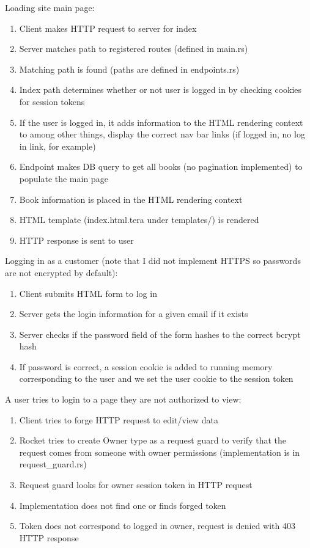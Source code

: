 \documentclass{article}
\begin{document}
Loading site main page:
\begin{enumerate}
  \item Client makes HTTP request to server for index
  \item Server matches path to registered routes (defined in main.rs)
  \item Matching path is found (paths are defined in endpoints.rs)
  \item Index path determines whether or not user is logged in by checking cookies for session tokens
  \item If the user is logged in, it adds information to the HTML rendering context to among other things, display the correct nav bar links (if logged in, no log in link, for example)
  \item Endpoint makes DB query to get all books (no pagination implemented) to populate the main page
  \item Book information is placed in the HTML rendering context
  \item HTML template (index.html.tera under templates/) is rendered
  \item HTTP response is sent to user
\end{enumerate}

Logging in as a customer (note that I did not implement HTTPS so passwords are not encrypted by default):
\begin{enumerate}
  \item Client submits HTML form to log in
  \item Server gets the login information for a given email if it exists
  \item Server checks if the password field of the form hashes to the correct bcrypt hash
  \item If password is correct, a session cookie is added to running memory corresponding to the user and we set the user cookie to the session token
\end{enumerate}

A user tries to login to a page they are not authorized to view:
\begin{enumerate}
  \item Client tries to forge HTTP request to edit/view data
  \item Rocket tries to create Owner type as a request guard to verify that the request comes from someone with owner permissions (implementation is in request_guard.rs)
  \item Request guard looks for owner session token in HTTP request
  \item Implementation does not find one or finds forged token
  \item Token does not correspond to logged in owner, request is denied with 403 HTTP response
\end{enumerate}
\end{document}
